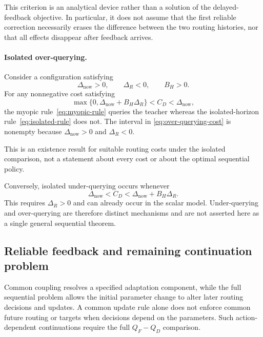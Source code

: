 This criterion is an analytical device rather than a solution of the
delayed-feedback objective. In particular, it does not assume that the
first reliable correction necessarily erases the difference between the
two routing histories, nor that all effects disappear after feedback
arrives.

\paragraph{Isolated over-querying.}
Consider a configuration satisfying
\begin{equation}
    \Delta_{\mathrm{now}}>0,
    \qquad
    \Delta_R<0,
    \qquad
    B_H>0.
\end{equation}
For any nonnegative cost satisfying
\begin{equation}
    \max\{0,\Delta_{\mathrm{now}}+B_H\Delta_R\}
    <
    C_D
    <
    \Delta_{\mathrm{now}},
    \label{eq:over-querying-cost}
\end{equation}
the myopic rule~\eqref{eq:myopic-rule} queries the teacher whereas the
isolated-horizon rule~\eqref{eq:isolated-rule} does not. The interval in
\eqref{eq:over-querying-cost} is nonempty because
$\Delta_{\mathrm{now}}>0$ and $\Delta_R<0$.

This is an existence result for suitable routing costs under the isolated
comparison, not a statement about every cost or about the optimal sequential
policy.

Conversely, isolated under-querying occurs whenever
\begin{equation}
    \Delta_{\mathrm{now}}
    <
    C_D
    <
    \Delta_{\mathrm{now}}+B_H\Delta_R.
\end{equation}
This requires $\Delta_R>0$ and can already occur in the scalar model.
Under-querying and over-querying are therefore distinct mechanisms and are
not asserted here as a single general sequential theorem.

\subsection{Reliable feedback and remaining continuation problem}

Common coupling resolves a specified adaptation component, while the full
sequential problem allows the initial parameter change to alter later
routing decisions and updates. A common update rule alone does not enforce
common future routing or targets when decisions depend on the parameters.
Such action-dependent continuations require the full $Q_F-Q_D$ comparison.


